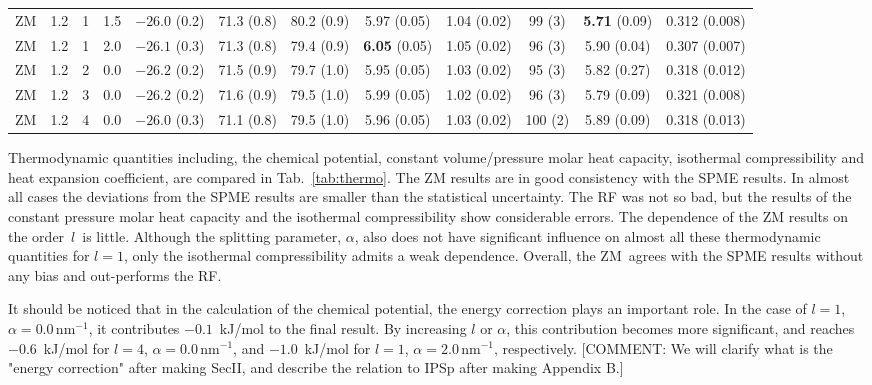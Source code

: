 \documentclass[a4paper,preprint,unsortedaddress,onecolumn,fleqn]{revtex4}
\begin{document}
\begin{sidewaystable}
\begin{tabular*}{0.99\textwidth}{@{\extracolsep{\fill}}cccc cccccccc}
    ZM          &1.2 & 1  &1.5 & $-26.0$ (0.2) & 71.3 (0.8)  &80.2 (0.9)           & 5.97 (0.05)               &1.04 (0.02)          & 99 (3)          & \textbf{5.71} (0.09)&        {0.312} (0.008)\\ 
    ZM          &1.2 & 1  &2.0 & $-26.1$ (0.3) & 71.3 (0.8)  &79.4 (0.9)           & \textbf{6.05} (0.05)      &1.05 (0.02)          & 96 (3)          &        {5.90} (0.04)&        {0.307} (0.007)\\\hline
    ZM          &1.2 & 2  &0.0 & $-26.2$ (0.2) & 71.5 (0.9)  &79.7 (1.0)           & 5.95 (0.05)               &1.03 (0.02)          & 95 (3)          &         5.82  (0.27)&         0.318  (0.012)\\
    ZM          &1.2 & 3  &0.0 & $-26.2$ (0.2) & 71.6 (0.9)  &79.5 (1.0)           & 5.99 (0.05)               &1.02 (0.02)          & 96 (3)          &         5.79  (0.09)&         0.321  (0.008)\\
    ZM          &1.2 & 4  &0.0 & $-26.0$ (0.3) & 71.1 (0.8)  &79.5 (1.0)           & 5.96 (0.05)               &1.03 (0.02)          &100 (2)          &         5.89  (0.09)&         0.318  (0.013)\\
    \hline\hline
  \end{tabular*}
  \label{tab:thermo}
\end{sidewaystable}

Thermodynamic quantities including, the chemical potential, constant
volume/pressure molar heat capacity, isothermal compressibility and heat
expansion coefficient, are compared in Tab.~\ref{tab:thermo}. The ZM results
are in good consistency with the SPME results. In almost all cases the
deviations from the SPME results are smaller than the statistical
uncertainty. The RF was not so bad, but the results of the constant pressure
molar heat capacity and the isothermal compressibility show considerable
errors. The dependence of the ZM results on the order\ $l$\ is little. Although the splitting parameter, $\alpha $,
also does not have significant influence on almost all these thermodynamic
quantities for $l=1$, only the isothermal compressibility admits a weak
dependence. Overall, the ZM\ agrees with the SPME results without any bias
and out-performs the RF.

It should be noticed that in the calculation of the chemical
potential, the energy correction plays an important role. In the case of $%
l=1 $, $\alpha =0.0\,\text{nm}^{-1}$, it contributes $-0.1$~kJ/mol to the
final result. By increasing $l$ or $\alpha $, this contribution becomes more
significant, and reaches $-0.6$~kJ/mol for $l=4$, $\alpha =0.0\,\text{nm}%
^{-1}$, and $-1.0$~kJ/mol for $l=1$, $\alpha =2.0\,\text{nm}^{-1}$,
respectively. [{\color{blue}COMMENT: We will clarify what is the "energy
correction" after making SecII, and describe the relation to IPSp after
making Appendix B.}] 
\end{document}
